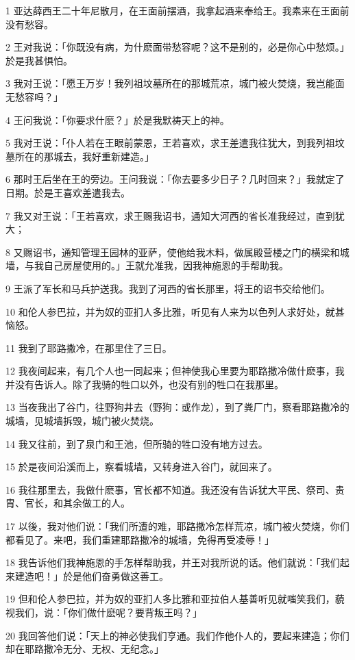 \par 1 亚达薛西王二十年尼散月，在王面前摆酒，我拿起酒来奉给王。我素来在王面前没有愁容。
\par 2 王对我说：「你既没有病，为什麽面带愁容呢？这不是别的，必是你心中愁烦。」於是我甚惧怕。
\par 3 我对王说：「愿王万岁！我列祖坟墓所在的那城荒凉，城门被火焚烧，我岂能面无愁容吗？」
\par 4 王问我说：「你要求什麽？」於是我默祷天上的神。
\par 5 我对王说：「仆人若在王眼前蒙恩，王若喜欢，求王差遣我往犹大，到我列祖坟墓所在的那城去，我好重新建造。」
\par 6 那时王后坐在王的旁边。王问我说：「你去要多少日子？几时回来？」我就定了日期。於是王喜欢差遣我去。
\par 7 我又对王说：「王若喜欢，求王赐我诏书，通知大河西的省长准我经过，直到犹大；
\par 8 又赐诏书，通知管理王园林的亚萨，使他给我木料，做属殿营楼之门的横梁和城墙，与我自己房屋使用的。」王就允准我，因我神施恩的手帮助我。
\par 9 王派了军长和马兵护送我。我到了河西的省长那里，将王的诏书交给他们。
\par 10 和伦人参巴拉，并为奴的亚扪人多比雅，听见有人来为以色列人求好处，就甚恼怒。
\par 11 我到了耶路撒冷，在那里住了三日。
\par 12 我夜间起来，有几个人也一同起来；但神使我心里要为耶路撒冷做什麽事，我并没有告诉人。除了我骑的牲口以外，也没有别的牲口在我那里。
\par 13 当夜我出了谷门，往野狗井去（野狗：或作龙），到了粪厂门，察看耶路撒冷的城墙，见城墙拆毁，城门被火焚烧。
\par 14 我又往前，到了泉门和王池，但所骑的牲口没有地方过去。
\par 15 於是夜间沿溪而上，察看城墙，又转身进入谷门，就回来了。
\par 16 我往那里去，我做什麽事，官长都不知道。我还没有告诉犹大平民、祭司、贵胄、官长，和其余做工的人。
\par 17 以後，我对他们说：「我们所遭的难，耶路撒冷怎样荒凉，城门被火焚烧，你们都看见了。来吧，我们重建耶路撒冷的城墙，免得再受凌辱！」
\par 18 我告诉他们我神施恩的手怎样帮助我，并王对我所说的话。他们就说：「我们起来建造吧！」於是他们奋勇做这善工。
\par 19 但和伦人参巴拉，并为奴的亚扪人多比雅和亚拉伯人基善听见就嗤笑我们，藐视我们，说：「你们做什麽呢？要背叛王吗？」
\par 20 我回答他们说：「天上的神必使我们亨通。我们作他仆人的，要起来建造；你们却在耶路撒冷无分、无权、无纪念。」

